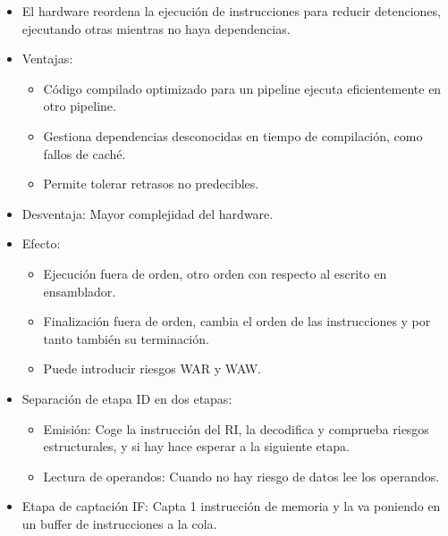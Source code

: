 \documentclass[12pt, twoside, openright]{report} %
\begin{document}
\begin{itemize}

	\item El hardware reordena la ejecución de instrucciones para reducir
	      detenciones, ejecutando otras mientras no haya dependencias.
	\item Ventajas:

	      \begin{itemize}

		      \item Código compilado optimizado para un pipeline ejecuta
		            eficientemente en otro pipeline.
		      \item Gestiona dependencias desconocidas en tiempo de compilación, como
		            fallos de caché.
		      \item Permite tolerar retrasos no predecibles.
	      \end{itemize}
	\item Desventaja: Mayor complejidad del hardware.
	\item Efecto:

	      \begin{itemize}

		      \item Ejecución fuera de orden, otro orden con respecto al escrito en
		            ensamblador.
		      \item Finalización fuera de orden, cambia el orden de las instrucciones
		            y por tanto también su terminación.
		      \item Puede introducir riesgos WAR y WAW.
	      \end{itemize}
	\item Separación de etapa ID en dos etapas:

	      \begin{itemize}

		      \item Emisión: Coge la instrucción del RI, la decodifica y comprueba
		            riesgos estructurales, y si hay hace esperar a la siguiente etapa.
		      \item Lectura de operandos: Cuando no hay riesgo de datos lee los
		            operandos.
	      \end{itemize}
	\item Etapa de captación IF: Capta 1 instrucción de memoria y la va
	      poniendo en un buffer de instrucciones a la cola.

	      \begin{itemize}


\end{itemize}
\end{itemize}
\end{document}
